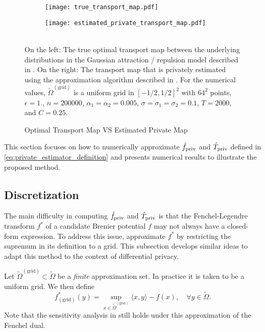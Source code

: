 \documentclass{article}
\theoremstyle{plain}
\theoremstyle{definition}
\theoremstyle{remark}
\begin{document}
\begin{figure*}[h!]
    \begin{subfigure}{}
        \centering
        \texttt{[image: true\_transport\_map.pdf]}  
        \label{fig:sub-first}
    \end{subfigure}
    \begin{subfigure}{}
        \centering
        \texttt{[image: estimated\_private\_transport\_map.pdf]}  
        \label{fig:sub-second}
    \end{subfigure} 
    \\
    \centering
    On the left: The true optimal transport map between the underlying distributions in the Gaussian attraction / repulsion model described in . On the right: The transport map that is privately estimated using the approximation algorithm described in .
    For the numerical values, $\tilde{\Omega}^{(\text{grid})}$ is a uniform grid in $[-1/2, 1/2]^2$ with $64^2$ points, 
    $\epsilon = 1.$, $n = 200000$, $\alpha_1=\alpha_2 = 0.005$, $\sigma=  \sigma_1=\sigma_2 = 0.1$, $T = 2000$, and $C=0.25$.
    \caption{Optimal Transport Map VS Estimated Private Map}
    \label{fig:true_vs_estimates}
    \end{figure*}

This section focuses on how to numerically approximate $\hat{f}_{\text{\normalshape priv}}$ and $\hat{T}_{\text{\normalshape priv}}$ defined in \eqref{eq:private_estimator_definition} and presents numerical results to illustrate the proposed method.

\subsection{Discretization}
\label{sec:discretized_approximation_algorithm}

The main difficulty in computing $\hat{f}_{\text{\normalshape priv}}$ and $\hat{T}_{\text{\normalshape priv}}$ is that the Fenchel-Legendre transform $f^*$ of a candidate Brenier potential $f$ may not always have a closed-form expression. 
To address this issue, \cite{hutter2021minimax} approximate $f^*$ by restricting the supremum in its definition to a grid. 
This subsection develops similar ideas to adapt this method to the context of differential privacy.

Let $\tilde{\Omega}^{(\text{grid})} \subset \tilde{\Omega}$ be a \emph{finite} approximation set. 
In practice it is taken to be a uniform grid.
We then define
\begin{equation}
    f^*_{(\text{grid})}(y) = \sup_{x \in \tilde{\Omega}^{(\text{grid})}} \langle x, y \rangle - f(x), \quad \forall y \in \tilde{\Omega}.
\end{equation}
Note that the sensitivity analysis in  still holds under this approximation of the Fenchel dual.
\end{document}
